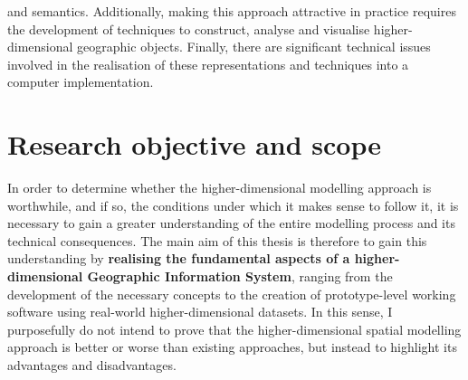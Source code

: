 and semantics.
Additionally, making this approach attractive in practice requires the development of techniques to construct, analyse and visualise higher-dimensional geographic objects.
Finally, there are significant technical issues involved in the realisation of these representations and techniques into a computer implementation.

\section{Research objective and scope}
\label{se:objective}

In order to determine whether the higher-dimensional modelling approach is worthwhile, and if so, the conditions under which it makes sense to follow it, it is necessary to gain a greater understanding of the entire modelling process and its technical consequences.
The main aim of this thesis is therefore to gain this understanding by \textbf{realising the fundamental aspects of a higher-dimensional Geographic Information System}, ranging from the development of the necessary concepts to the creation of prototype-level working software using real-world higher-dimensional datasets.
In this sense, I purposefully do not intend to prove that the higher-dimensional spatial modelling approach is better or worse than existing approaches, but instead to highlight its advantages and disadvantages.

